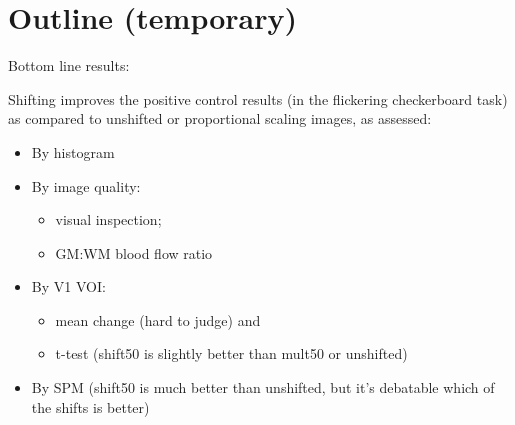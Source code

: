 \section{Outline (temporary)}
Bottom line results:

Shifting improves the positive control results (in the flickering checkerboard task) as compared to unshifted or proportional scaling images, as assessed:
\begin{itemize}
\item By histogram
\item By image quality: 
  \begin{itemize}
  \item visual inspection;
  \item GM:WM blood flow ratio
  \end{itemize}
\item By V1 VOI: 
  \begin{itemize} 
    \item mean change (hard to judge) and 
    \item t-test (shift50 is slightly better than mult50 or unshifted)
  \end{itemize}
\item By SPM (shift50 is much better than unshifted, but it's debatable which of the shifts is better)
\end{itemize}
